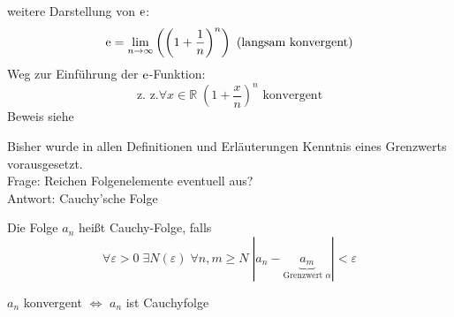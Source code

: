 %
\noindent weitere Darstellung von $\operatorname{e}$:
\begin{equation*}
  \operatorname{e} = \lim_{n \rightarrow \infty} \left( \left(1+\frac 1 n\right)^n \right)\text{ (langsam konvergent)}
\end{equation*}
%
Weg zur Einführung der $\operatorname{e}$-Funktion:
\begin{equation*}
  \text{z. z.} \forall x \in \mathbb{R}\; \left( 1 + \frac x n \right)^n \text{ konvergent}
\end{equation*}
Beweis siehe \cite[S. 32]{bornemann}

\begin{note}
  Bisher wurde in allen Definitionen und Erläuterungen Kenntnis eines Grenzwerts vorausgesetzt.\\
  Frage: Reichen Folgenelemente eventuell aus?\\
  Antwort: Cauchy'sche Folge
\end{note}

\begin{definition}
  Die Folge $a_n$ heißt Cauchy-Folge, falls
  \[ \forall \varepsilon > 0\; \exists N(\varepsilon)\; \forall n,m \geq N\; |a_n-\underbrace{a_m}_{\text{Grenzwert } \alpha}| < \varepsilon \]
\end{definition}

\begin{proposition}
  $a_n$ konvergent $\Leftrightarrow$ $a_n$ ist Cauchyfolge
\end{proposition}

